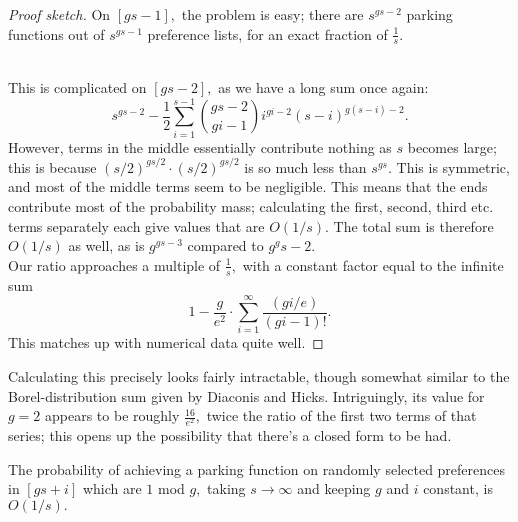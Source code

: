 \begin{proof}[Proof sketch]
    On $[gs-1],$ the problem is easy; there are $s^{gs-2}$ parking functions out of $s^{gs-1}$ preference lists, for an exact fraction of $\frac{1}{s}$.\\~

    This is complicated on $[gs-2],$ as we have a long sum once again: $$s^{gs-2}-\frac{1}{2}\sum_{i=1}^{s-1}\binom{gs-2}{gi-1}i^{gi-2}(s-i)^{g(s-i)-2}.$$ However, terms in the middle essentially contribute nothing as $s$ becomes large; this is because $(s/2)^{gs/2}\cdot(s/2)^{gs/2}$ is so much less than $s^{gs}.$ This is symmetric, and most of the middle terms seem to be negligible. This means that the ends contribute most of the probability mass; calculating the first, second, third etc. terms separately each give values that are $O(1/s).$ The total sum is therefore $O(1/s)$ as well, as is $g^{gs-3}$ compared to $g^g{s-2}.$\\
    
    Our ratio approaches a multiple of $\frac{1}{s},$ with a constant factor equal to the infinite sum $$1-\frac{g}{e^2}\cdot\sum_{i=1}^{\infty}\frac{(gi/e)}{(gi-1)!}.$$ This matches up with numerical data quite well.
\end{proof}

Calculating this precisely looks fairly intractable, though somewhat similar to the Borel-distribution sum given by Diaconis and Hicks. Intriguingly, its value for $g=2$ appears to be roughly $\frac{16}{e^2},$ twice the ratio of the first two terms of that series; this opens up the possibility that there's a closed form to be had.

\begin{conjecture}
    The probability of achieving a parking function on randomly selected preferences in $[gs+i]$ which are $1$ mod $g,$ taking $s\to\infty$ and keeping $g$ and $i$ constant, is $O(1/s).$
\end{conjecture}
